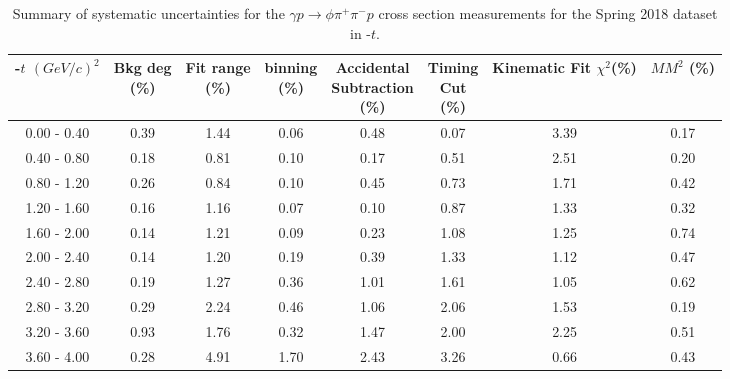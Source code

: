 \begin{center}
\begin{table}[!htbp]
    \small
    \centering
    \caption{Summary of systematic uncertainties for the $\gamma p \rightarrow \phi \pi^{+} \pi^{-} p$ cross section measurements for the Spring 2018 dataset in -$t$.}
    \label{tab.y2175.syserr.phi2pi.3.2}
    \begin{tabular}{|c|c|c|c|c|c|c|c|}
        \hline
        -$t$ $(GeV/c)^{2}$&\thead{Bkg deg\\(\%)}&\thead{Fit range\\(\%)}&\thead{binning\\(\%)}&\thead{Accidental\\Subtraction\\(\%)}&\thead{Timing\\Cut\\(\%)}&\thead{Kinematic\\Fit $\chi^{2}$(\%)}&\thead{$MM^{2}$\\(\%)}\\
        \hline
        0.00 - 0.40 & 0.39 & 1.44 & 0.06 & 0.48 & 0.07 & 3.39 & 0.17 \\ 
        0.40 - 0.80 & 0.18 & 0.81 & 0.10 & 0.17 & 0.51 & 2.51 & 0.20 \\ 
        0.80 - 1.20 & 0.26 & 0.84 & 0.10 & 0.45 & 0.73 & 1.71 & 0.42 \\ 
        1.20 - 1.60 & 0.16 & 1.16 & 0.07 & 0.10 & 0.87 & 1.33 & 0.32 \\ 
        1.60 - 2.00 & 0.14 & 1.21 & 0.09 & 0.23 & 1.08 & 1.25 & 0.74 \\ 
        2.00 - 2.40 & 0.14 & 1.20 & 0.19 & 0.39 & 1.33 & 1.12 & 0.47 \\ 
        2.40 - 2.80 & 0.19 & 1.27 & 0.36 & 1.01 & 1.61 & 1.05 & 0.62 \\ 
        2.80 - 3.20 & 0.29 & 2.24 & 0.46 & 1.06 & 2.06 & 1.53 & 0.19 \\ 
        3.20 - 3.60 & 0.93 & 1.76 & 0.32 & 1.47 & 2.00 & 2.25 & 0.51 \\ 
        3.60 - 4.00 & 0.28 & 4.91 & 1.70 & 2.43 & 3.26 & 0.66 & 0.43 \\
        \hline
    \end{tabular}
\end{table}
\null
\vfill
\end{center}

